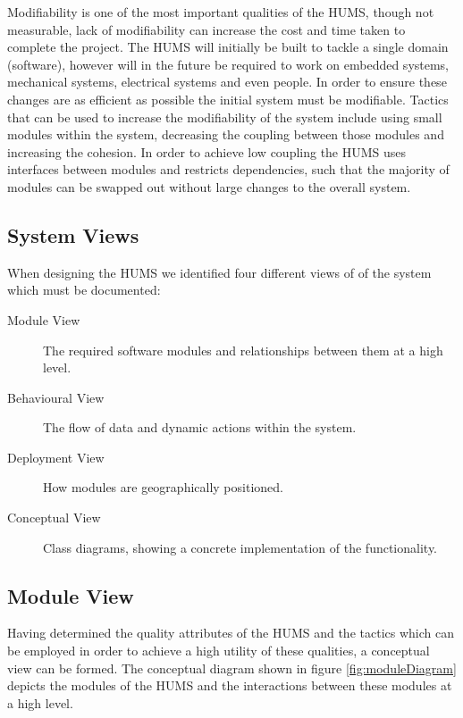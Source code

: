 Modifiability is one of the most important qualities of the HUMS, though not measurable, lack of modifiability can increase the cost and time taken to complete the project. The HUMS will initially be built to tackle a single domain (software), however will in the future be required to work on embedded systems, mechanical systems, electrical systems and even people. In order to ensure these changes are as efficient as possible the initial system 
must be modifiable. Tactics that can be used to increase the modifiability of the system include using small modules within the system, decreasing the coupling between those modules and increasing the cohesion. In order to achieve low coupling  the HUMS uses interfaces between modules and restricts dependencies, such that the majority of modules can be swapped out without large changes to the overall system.

\subsection{System Views}
\label{sec:architecture-views}

When designing the HUMS we identified four different views of of the system which must be documented:
\begin{description}
\item[Module View] The required software modules and relationships between them at a high level.
\item[Behavioural View] The flow of data and dynamic actions within the system.
\item[Deployment View] How modules are geographically positioned.
\item[Conceptual View] Class diagrams, showing a concrete implementation of the functionality.
\end{description}

\subsection{Module View}
\label{sec:architecture-moduleview}

Having determined the quality attributes of the HUMS and the tactics which can be employed in order to achieve a high utility of these qualities, a conceptual view can be formed. The conceptual diagram shown in figure \ref{fig:moduleDiagram} depicts the modules of the HUMS and the interactions between these modules at a high level.

